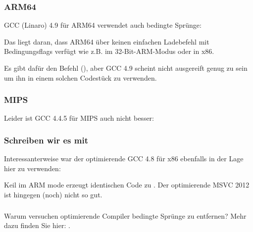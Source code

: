 

\subsubsection{ARM64}

\Optimizing GCC (Linaro) 4.9 für ARM64 verwendet auch bedingte Sprünge:

 Das liegt daran, dass ARM64 über keinen
einfachen Ladebefehl mit Bedingungsflags verfügt wie z.B.  im 32-Bit-ARM-Modus oder  in x86.

Es gibt dafür den  Befehl (), aber GCC 4.9
scheint nicht ausgereift genug zu sein um ihn in einem solchen Codestück zu verwenden.

\subsubsection{MIPS}

Leider ist GCC 4.4.5 für MIPS auch nicht besser:



\subsubsection{Schreiben wir es mit }



Interessanterweise war der optimierende GCC 4.8 für x86 ebenfalls in der Lage  hier zu verwenden:



\Optimizing Keil im ARM mode erzeugt identischen Code zu .
Der optimierende MSVC 2012 ist hingegen (noch) nicht so gut.


\subsubsection{\Conclusion{}}
Warum versuchen optimierende Compiler bedingte Sprünge zu entfernen? Mehr dazu finden Sie hier:
.
